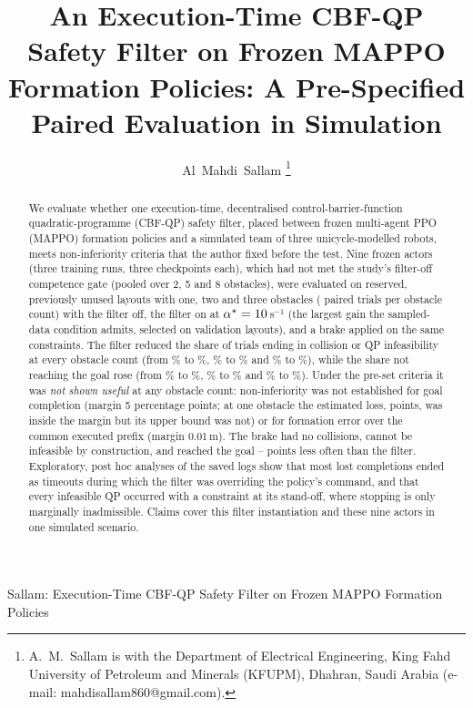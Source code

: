 \documentclass[journal]{IEEEtran}
\begin{document}
\title{An Execution-Time CBF-QP Safety Filter on Frozen MAPPO Formation Policies:
A Pre-Specified Paired Evaluation in Simulation}

\author{Al~Mahdi~Sallam%
\thanks{A.~M.~Sallam is with the Department of Electrical Engineering, King Fahd University of
Petroleum and Minerals (KFUPM), Dhahran, Saudi Arabia (e-mail: mahdisallam860@gmail.com).}}

\markboth{}%
{Sallam: Execution-Time CBF-QP Safety Filter on Frozen MAPPO Formation Policies}

\maketitle

\begin{abstract}
We evaluate whether one execution-time, decentralised control-barrier-function quadratic-programme
(CBF-QP) safety filter, placed between frozen multi-agent PPO (MAPPO) formation policies and a
simulated team of three unicycle-modelled robots, meets non-inferiority criteria that the author fixed
before the test. Nine frozen actors (three training runs, three checkpoints each), which had not met
the study's filter-off competence gate (pooled over 2, 5 and 8 obstacles), were evaluated on reserved, previously unused layouts with
one, two and three obstacles (\PairsPerDensity{} paired trials per obstacle count) with the filter off,
the filter on at $\alpha^\star=10$\,s$^{-1}$ (the largest gain the sampled-data condition
admits, selected on validation layouts), and a brake applied on the same constraints. The filter
reduced the share of trials ending in collision or QP infeasibility at every obstacle count (from
\FailOffone\% to \FailOnone\%, \FailOfftwo\% to \FailOntwo\% and \FailOffthree\% to \FailOnthree\%),
while the share not reaching the goal rose (from \NonGoalOffone\% to \NonGoalOnone\%,
\NonGoalOfftwo\% to \NonGoalOntwo\% and \NonGoalOffthree\% to \NonGoalOnthree\%). Under the pre-set
criteria it was \emph{not shown useful} at any obstacle count: non-inferiority was not established for
goal completion (margin 5 percentage points; at one obstacle the estimated loss, \Blossone{} points, was
inside the margin but its upper bound was not) or for formation error over the common executed prefix
(margin 0.01\,m). The brake had no collisions, cannot be infeasible by construction, and reached the
goal \OnBmGoalMin--\OnBmGoalMax{} points less often than the filter. Exploratory, post hoc analyses of
the saved logs show that most lost completions ended as timeouts during which the filter was overriding
the policy's command, and that every infeasible QP occurred with a constraint at its stand-off, where
stopping is only marginally inadmissible. Claims cover this filter instantiation and these nine actors
in one simulated scenario.
\end{abstract}
\end{document}
